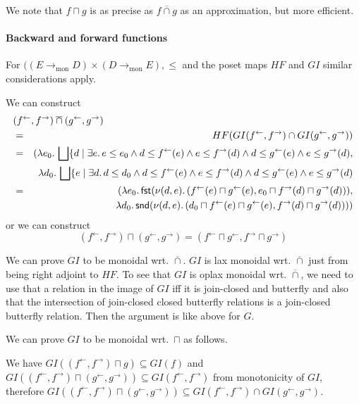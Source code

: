 \documentclass[9pt]{article}
\newcommand{\tomon}{\to_{\mathrm{mon}}}
\newcommand{\ff}{{f^{\rightarrow}}}
\newcommand{\fb}{{f^{\leftarrow}}}
\newcommand{\gf}{{g^{\rightarrow}}}
\newcommand{\gb}{{g^{\leftarrow}}}
\newcommand{\bigjoin}{\bigsqcup}
\newcommand{\meet}{\sqcap}
\newcommand{\con}{\wedge}
\newcommand{\fst}{\mathsf{fst}}
\newcommand{\snd}{\mathsf{snd}}
\newcommand{\caplift}{\mathbin{\overline{\cap}}}
\begin{document}
We note that $f \meet g$ is as precise as $f \caplift g$ as an
approximation, but more efficient. 


\paragraph{Backward and forward functions}

For $((E \tomon D) \times (D \tomon E), \leq$ and the poset maps $HF$
and $GI$ similar considerations apply.

We can construct
\begin{eqnarray*}
\lefteqn{  (\fb, \ff) \caplift (\gb, \gf) } \\
  & = & HF ( GI (\fb, \ff) \cap GI (\gb, \gf) ) \\
  & = & (\lambda e_0.\, \bigjoin \{ d \mid \exists e.\, e \leq e_0
         \con d \leq \fb(e) \con e \leq \ff(d)
         \con d \leq \gb(e) \con e \leq \gf(d), \\
  & &   \lambda d_0.\,
         \bigjoin \{ e \mid \exists d.\, d \leq d_0
         \con d \leq \fb(e) \con e \leq \ff(d)
         \con d \leq \gb(e) \con e \leq \gf(d) \\
  & = & (\lambda e_0.\, \fst (\nu (d,e).\, (\fb(e) \meet \gb(e), e_0 \meet \ff(d) \meet \gf(d))), \\
  & &     \lambda d_0.\, \snd (\nu (d,e).\, (d_0 \meet \fb(e) \meet \gb(e), \ff(d) \meet \gf(d))))   
\end{eqnarray*}
or we can construct
\[
  (\fb, \ff) \meet (\gb, \gf)
    = (\fb \meet \gb, \ff \meet \gf)
\]  


We can prove $GI$ to be monoidal wrt. $\caplift$. $GI$ is lax monoidal
wrt. $\caplift$ just from being right adjoint to $HF$. To see that
$GI$ is oplax monoidal wrt. $\caplift$, we need to use that a relation
in the image of $GI$ iff it is join-closed and butterfly and also that
the intersection of join-closed closed butterfly relations is
a join-closed butterfly relation. Then the argument is like above for $G$.


We can prove $GI$ to be monoidal wrt.\ $\meet$ as follows.

We have $GI ((\fb,\ff) \meet g) \subseteq GI (f)$ and
$GI ((\fb,\ff) \meet (\gb,\gf)) \subseteq GI (\fb,\ff)$ from monotonicity of $GI$, therefore
$GI ((\fb,\ff) \meet (\gb,\gf)) \subseteq GI (\fb,\ff) \cap GI (\gb,\gf)$.
\end{document}
